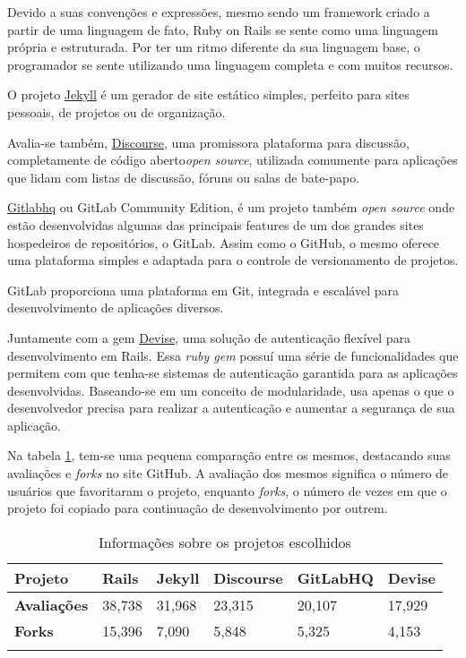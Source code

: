 \documentclass[11pt,a4paper,usenames,dvipsnames]{article}
\begin{document}
Devido a suas convenções e expressões, mesmo sendo um framework criado a partir de uma linguagem de fato, Ruby on Rails se sente como uma linguagem própria e estruturada. Por ter um ritmo diferente da sua linguagem base, o programador se sente utilizando uma linguagem completa e com muitos recursos\cite{RFR}.

O projeto \href{https://github.com/jekyll/jekyll}{Jekyll} é um gerador de site estático simples, perfeito para sites pessoais, de projetos ou de organização. 

Avalia-se também, \href{https://github.com/discourse/discourse}{Discourse}, uma promissora plataforma para discussão, completamente de código aberto\textit{open source}, utilizada comumente para aplicações que lidam com listas de discussão, fóruns ou salas de bate-papo.

\href{https://github.com/gitlabhq/gitlabhq}{Gitlabhq} ou GitLab Community Edition, é um projeto também \textit{open source} onde estão desenvolvidas algumas das principais features de um dos grandes sites hospedeiros de repositórios, o GitLab. Assim como o GitHub, o mesmo oferece uma plataforma simples e adaptada para o controle de versionamento de projetos.

GitLab proporciona uma plataforma em Git, integrada e escalável para desenvolvimento de aplicações diversos\cite{GitLab}.

Juntamente com a {gem} \href{https://github.com/plataformatec/devise}{Devise}, uma solução de autenticação flexível para desenvolvimento em Rails. Essa \textit{ruby gem} possuí uma série de funcionalidades que permitem com que tenha-se sistemas de autenticação garantida para as aplicações desenvolvidas. Baseando-se em um conceito de modularidade, usa apenas o que o desenvolvedor precisa para realizar a autenticação e aumentar a segurança de sua aplicação.

Na tabela \ref{tab:projects_infos}, tem-se uma pequena comparação entre os mesmos, destacando suas avaliações e \textit{forks} no site GitHub. A avaliação dos mesmos significa o número de usuários que favoritaram o projeto, enquanto \textit{forks}, o número de vezes em que o projeto foi copiado para continuação de desenvolvimento por outrem. 


\begin{table}[h]
\centering
\begin{tabular}{@{}llllll@{}}
\toprule
\textbf{Projeto} & Rails & Jekyll & Discourse & GitLabHQ & Devise \\ \midrule
\textbf{Avaliações} & 38,738 & 31,968 & 23,315 & 20,107 & 17,929 \\
\textbf{Forks} & 15,396 & 7,090 & 5,848 & 5,325 & 4,153 \\
 &  &  &  &  &  \\ \bottomrule
\end{tabular}
\caption{Informações sobre os projetos escolhidos}
\label{tab:projects_infos}
\end{table}
\end{document}
